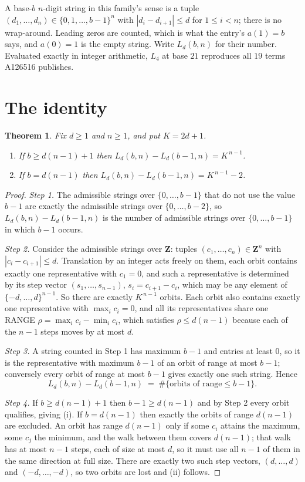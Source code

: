 \documentclass[11pt,a4paper]{article}
\theoremstyle{plain}
\newtheorem{theorem}{Theorem}
\theoremstyle{definition}
\begin{document}
A base-$b$ $n$-digit string in this family's sense is a tuple
$(d_1,\dots,d_n)\in\{0,1,\dots,b-1\}^{n}$ with $|d_i-d_{i+1}|\le d$ for $1\le i<n$; there
is no wrap-around. Leading zeros are counted, which is what the entry's $a(1)=b$ says, and
$a(0)=1$ is the empty string. Write $L_d(b,n)$ for their number. Evaluated exactly in integer
arithmetic, $L_{4}$ at base $21$ reproduces all $19$ terms A126516 publishes.

\section{The identity}

\begin{theorem}
Fix $d\ge1$ and $n\ge1$, and put $K=2d+1$.
\begin{enumerate}
\item[(i)] If $b\ge d(n-1)+1$ then $L_d(b,n)-L_d(b-1,n)=K^{\,n-1}$.
\item[(ii)] If $b=d(n-1)$ then $L_d(b,n)-L_d(b-1,n)=K^{\,n-1}-2$.
\end{enumerate}
\end{theorem}

\begin{proof}
\emph{Step 1.} The admissible strings over $\{0,\dots,b-1\}$ that do not use the value $b-1$
are exactly the admissible strings over $\{0,\dots,b-2\}$, so $L_d(b,n)-L_d(b-1,n)$ is the
number of admissible strings over $\{0,\dots,b-1\}$ in which $b-1$ occurs.

\emph{Step 2.} Consider the admissible strings over $\mathbf{Z}$: tuples
$(c_1,\dots,c_n)\in\mathbf{Z}^{n}$ with $|c_i-c_{i+1}|\le d$. Translation by an integer acts
freely on them, each orbit contains exactly one representative with $c_1=0$, and such a
representative is determined by its step vector $(s_1,\dots,s_{n-1})$, $s_i=c_{i+1}-c_i$,
which may be any element of $\{-d,\dots,d\}^{n-1}$. So there are exactly $K^{\,n-1}$ orbits.
Each orbit also contains exactly one representative with $\max_i c_i=0$, and all its
representatives share one RANGE $\rho=\max_ic_i-\min_ic_i$, which satisfies
$\rho\le d(n-1)$ because each of the $n-1$ steps moves by at most $d$.

\emph{Step 3.} A string counted in Step 1 has maximum $b-1$ and entries at least $0$, so it is
the representative with maximum $b-1$ of an orbit of range at most $b-1$; conversely every orbit
of range at most $b-1$ gives exactly one such string. Hence
\[
L_d(b,n)-L_d(b-1,n)\;=\;\#\{\text{orbits of range}\le b-1\} .
\]

\emph{Step 4.} If $b\ge d(n-1)+1$ then $b-1\ge d(n-1)$ and by Step 2 every orbit qualifies,
giving (i). If $b=d(n-1)$ then exactly the orbits of range $d(n-1)$ are excluded. An orbit has
range $d(n-1)$ only if some $c_i$ attains the maximum, some $c_j$ the minimum, and the walk
between them covers $d(n-1)$; that walk has at most $n-1$ steps, each of size at most $d$, so it
must use all $n-1$ of them in the same direction at full size. There are exactly two such step
vectors, $(d,\dots,d)$ and $(-d,\dots,-d)$, so two orbits are lost and (ii) follows.
\end{proof}
\end{document}
